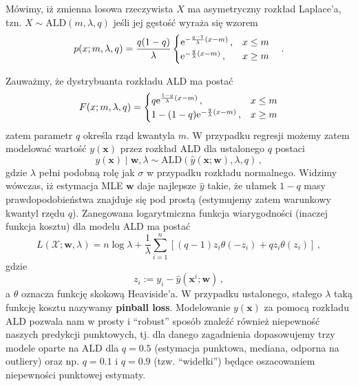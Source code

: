 \documentclass{myclass}
\numberwithin{equation}{subsection}
\begin{document}
\begin{definition}
Mówimy, iż zmienna losowa rzeczywista \(X\) ma asymetryczny rozkład Laplace'a, tzn. \(X \sim
\mathrm{ALD}(m, \lambda, q)\) jeśli jej gęstość wyraża się wzorem
\begin{equation*}
    p(x; m,\lambda,q) = \frac{q(1-q)}{\lambda}\begin{cases}
        \mathrm{e}^{-\frac{q-1}{\lambda} (x - m)}\,,&x \leq m\\
        \mathrm{e}^{-\frac{q}{\lambda} (x - m)}\,,&x \geq m
    \end{cases}\quad.
\end{equation*}
\end{definition}
Zauważmy, że dystrybuanta rozkładu ALD ma postać
\begin{equation}
    F(x; m,\lambda,q) = \begin{cases}
        q \mathrm{e}^{\frac{1-q}{\lambda}(x - m)}\,,&x \leq m\\
        1 - (1-q)\mathrm{e}^{-\frac{q}{\lambda}(x - m)}\,,&x \geq m
    \end{cases}
\end{equation}
zatem parametr \(q\) określa rząd kwantyla \(m\). W przypadku regresji możemy zatem modelować
wartość \(y(\mathbf{x})\) przez rozkład ALD dla ustalonego \(q\) postaci
\begin{equation}
    y(\mathbf{x}) \mid \mathbf{w}, \lambda \sim \mathrm{ALD}(\hat{y}(\mathbf{x}; \mathbf{w}), \lambda, q)\,,
\end{equation}
gdzie \(\lambda\) pełni podobną rolę jak \(\sigma\) w przypadku rozkładu normalnego. Widzimy
wówczas, iż estymacja MLE \(\mathbf{w}\) daje najlepsze \(\hat{y}\) takie, że ułamek \(1-q\) masy
prawdopodobieństwa znajduje się pod prostą (estymujemy zatem warunkowy kwantyl rzędu \(q\)).
Zanegowana logarytmiczna funkcja wiarygodności (inaczej funkcja kosztu) dla modelu ALD ma postać
\begin{equation}\boxed{
    L(\mathcal{X}; \mathbf{w}, \lambda) = n \log \lambda + \frac{1}{\lambda}\sum_{i=1}^n \left[(q-1)z_i\theta(-z_i) + qz_i\theta(z_i)\right]\,,
}\end{equation}
gdzie
\begin{equation}
    z_i := y_i - \hat{y}(\mathbf{x}^i;\mathbf{w})\,,
\end{equation}
a \(\theta\) oznacza funkcję skokową Heaviside'a. W przypadku ustalonego, stałego \(\lambda\) taką
funkcję kosztu nazywamy \textbf{pinball loss}. Modelowanie \(y(\mathbf{x})\) za pomocą rozkładu ALD
pozwala nam w prosty i \enquote{robust} sposób znaleźć również niepewność naszych predykcji
punktowych, tj. dla danego zagadnienia dopasowujemy trzy modele oparte na ALD dla \(q = 0.5\)
(estymacja punktowa, mediana, odporna na outliery) oraz np. \(q = 0.1\) i \(q = 0.9\) (tzw.
\enquote{widełki}) będące oszacowaniem niepewności punktowej estymaty. 
\end{document}
